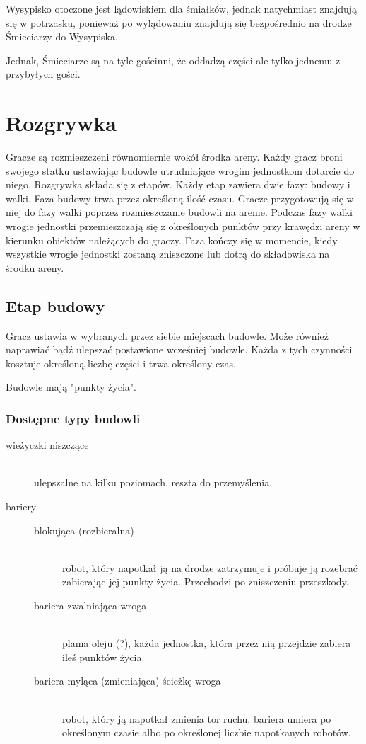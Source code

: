 \documentclass[a4paper,12pt]{report}
\begin{document}
Wysypisko otoczone jest lądowiskiem dla śmiałków, jednak natychmiast znajdują się w potrzasku, ponieważ po wylądowaniu znajdują się bezpośrednio na drodze Śmieciarzy do Wysypiska.

Jednak, Śmieciarze są na tyle gościnni, że oddadzą części ale tylko jednemu z przybyłych gości.

\chapter{Rozgrywka}

Gracze są rozmieszczeni równomiernie wokół środka areny. Każdy gracz broni swojego statku ustawiając budowle utrudniające wrogim jednostkom dotarcie do niego. Rozgrywka składa się z etapów. Każdy etap zawiera dwie fazy: budowy i walki. Faza budowy trwa przez określoną ilość czasu. Gracze przygotowują się w niej do fazy walki poprzez rozmieszczanie budowli na arenie. Podczas fazy walki wrogie jednostki przemieszczają się z określonych punktów przy krawędzi areny w kierunku obiektów należących do graczy. Faza kończy się w momencie, kiedy wszystkie wrogie jednostki zostaną zniszczone lub dotrą do składowiska na środku areny.

\section{Etap budowy}

Gracz ustawia w wybranych przez siebie miejscach budowle. Może również naprawiać bądź ulepszać postawione wcześniej budowle. Każda z tych czynności kosztuje określoną liczbę części i trwa określony czas.

Budowle mają "punkty życia".

\subsection{Dostępne typy budowli}

\begin{description}
\item[wieżyczki niszczące] \hfill\\ ulepszalne na kilku poziomach, reszta do przemyślenia.
\item[bariery] \hfill
	\begin{description}
	\item[blokująca (rozbieralna)] \hfill\\ robot, który napotkał ją na drodze zatrzymuje i próbuje ją rozebrać zabierając jej punkty życia. Przechodzi po zniszczeniu przeszkody.
	\item[bariera zwalniająca wroga] \hfill\\ plama oleju (?), każda jednostka, która przez nią przejdzie zabiera ileś punktów życia.
	\item[bariera myląca (zmieniająca) ścieżkę wroga] \hfill\\ robot, który ją napotkał zmienia tor ruchu. bariera umiera po określonym czasie albo po określonej liczbie napotkanych robotów.
	\end{description}
\end{description}
\end{document}
